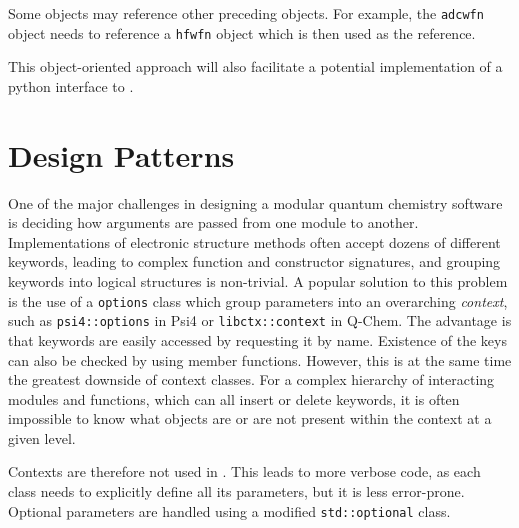 \noindent Some objects may reference other preceding objects. For example, the \texttt{adcwfn} object needs to reference a \texttt{hfwfn} object which is then used as the reference.

This object-oriented approach will also facilitate a potential implementation of a python interface to \mchem{}.

\section{Design Patterns}

One of the major challenges in designing a modular quantum chemistry software is deciding how arguments are passed from one module to another. Implementations of electronic structure methods often accept dozens of different keywords, leading to complex function and constructor signatures, and grouping keywords into logical structures is non-trivial. A popular solution to this problem is the use of a \texttt{options} class which group parameters into an overarching \emph{context}, such as \texttt{psi4::options} in Psi4 or \texttt{libctx::context} in Q-Chem. The advantage is that keywords are easily accessed by requesting it by name. Existence of the keys can also be checked by using member functions. However, this is at the same time the greatest downside of context classes. For a complex hierarchy of interacting modules and functions, which can all insert or delete keywords, it is often impossible to know what  objects are or are not present within the context at a given level. 

Contexts are therefore not used in \mchem{}. This leads to more verbose code, as each class needs to explicitly define all its parameters, but it is less error-prone. Optional parameters are handled using a modified \texttt{std::optional} class.

